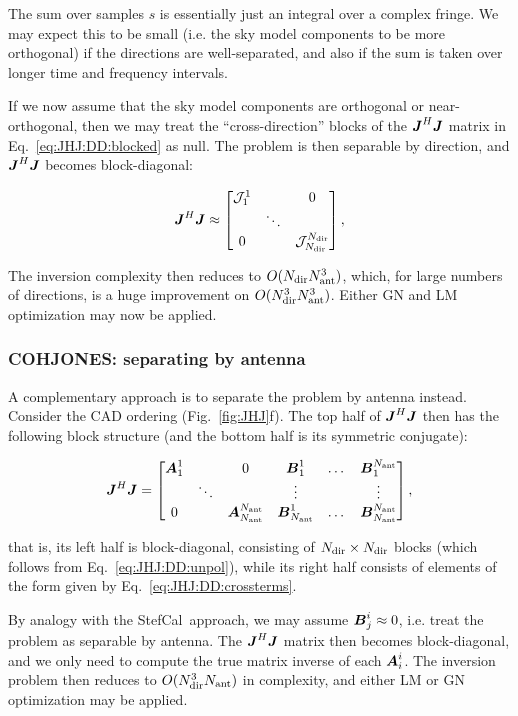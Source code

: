 \documentclass[useAMS,usenatbib]{mn2e}
\newcommand{\mat}[1]{{\bmath{#1}}}
\newcommand{\JJ}{\mat{J}} %
\newcommand{\JHJ}{\JJ^H\JJ} %
\newcommand{\StefCal}{{\sc StefCal}}
\begin{document}
The sum over samples $s$ is essentially just an integral over a complex fringe. We may expect this to be small (i.e. the
sky model components to be more orthogonal) if the directions are well-separated, and also if the sum is taken 
over longer time and frequency intervals. 

If we now assume that the sky model components are orthogonal or near-orthogonal, then 
we may treat the ``cross-direction'' blocks of the $\JHJ$ matrix in Eq.~\ref{eq:JHJ:DD:blocked} as null. The problem is 
then separable by direction, and $\JHJ$ becomes block-diagonal:


\begin{equation}
\label{eq:JHJ:DD:block-diag}
\JHJ \approx \Matrix{ccc}{\JJJ^1_1 &  & 0 \\
& \ddots &  \\
0 & & \JJJ_{\Nd}^{\Nd} },
\end{equation}

The inversion complexity then reduces to $O(N_\mathrm{dir}N_\mathrm{ant}^3)$, which, for large numbers of directions, is a huge improvement on 
$O(N_\mathrm{dir}^3N_\mathrm{ant}^3)$. Either GN and LM optimization may now be applied. 



\subsubsection{COHJONES: separating by antenna}

A complementary approach is to separate the problem by antenna instead. Consider the CAD ordering (Fig.~\ref{fig:JHJ}f). 
The top half of $\JHJ$ then has the following block structure (and the bottom half is its symmetric conjugate):

\newcommand{\JJX}{\bmath{A}}
\newcommand{\JJY}{\bmath{B}}

\begin{equation}
\label{eq:JHJ:DD:blocked-ant}
\JHJ = \Matrix{cccccc}{\JJX^1_1 &  & 0 & \JJY^1_1 & \dots & \JJY^{\Na}_1 \\
 & \ddots &  & \vdots & & \vdots \\
0 &  & \JJX_{\Na}^{\Na} & \JJY_{\Na}^1 & \dots & \JJY_{\Na}^{\Na} },
\end{equation}

that is, its left half is block-diagonal, consisting of $N_\mathrm{dir}\times N_\mathrm{dir}$ blocks (which follows
from Eq.~\ref{eq:JHJ:DD:unpol}), while its right half consists of elements of the form given by
Eq.~\ref{eq:JHJ:DD:crossterms}. 

By analogy with the \StefCal\ approach, we may assume $\JJY^i_j \approx 0$, i.e. treat the problem as
separable by antenna. The $\JHJ$ matrix then becomes block-diagonal, and we only need to compute the 
true matrix inverse of each $\JJX^i_i$. The inversion problem then reduces to $O(N_\mathrm{dir}^3N_\mathrm{ant})$ in complexity,
and either LM or GN optimization may be applied.
\end{document}
